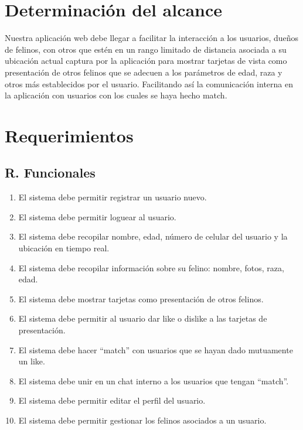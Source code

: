 \documentclass{article}
\begin{document}
\onehalfspacing    


\clearpage
\tableofcontents
\clearpage
\section{Determinación del alcance}
Nuestra aplicación web debe llegar a facilitar la interacción a los usuarios, dueños de felinos, con otros que estén en un rango limitado de distancia asociada a su ubicación actual captura por la aplicación para mostrar tarjetas de vista como presentación de otros felinos que se adecuen a los parámetros de edad, raza y otros más establecidos por el usuario. Facilitando así la comunicación interna en la aplicación con usuarios con los cuales se haya hecho match.
\section{Requerimientos}
\subsection{R. Funcionales}
\begin{enumerate}
    \item El sistema debe permitir registrar un usuario nuevo.
    \item El sistema debe permitir loguear al usuario.
    \item El sistema debe recopilar nombre, edad, número de celular del usuario y la ubicación en tiempo real.
    \item El sistema debe recopilar información sobre su felino: nombre, fotos, raza, edad.
    \item El sistema debe mostrar tarjetas como presentación de otros felinos.
    \item El sistema debe permitir al usuario dar like o dislike a las tarjetas de presentación.
    \item El sistema debe hacer “match” con usuarios que se hayan dado mutuamente un like.
    \item El sistema debe unir en un chat interno a los usuarios que tengan “match”.
    \item El sistema debe permitir editar el perfil del usuario.
    \item El sistema debe permitir gestionar los felinos asociados a un usuario.
\end{enumerate}
\end{document}
